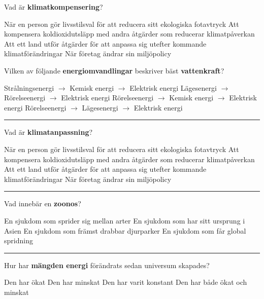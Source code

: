 \documentclass{exam}
\begin{document}
\begin{questions}
\question Vad är \textbf{klimatkompensering}?
\begin{checkboxes}
   \choice När en person gör livsstilsval för att reducera sitt ekologiska fotavtryck
   \choice Att kompensera koldioxidutsläpp med andra åtgärder som reducerar klimatpåverkan
   \choice Att ett land utför åtgärder för att anpassa sig utefter kommande klimatförändringar
   \choice När företag ändrar sin miljöpolicy
\end{checkboxes}

\break
\question Vilken av följande \textbf{energiomvandlingar} beskriver bäst \textbf{vattenkraft}?
\begin{checkboxes}
   \choice Strålningsenergi $\to$ Kemisk energi $\to$ Elektrisk energi
   \choice Lägesenergi $\to$ Rörelseenergi $\to$ Elektrisk energi
   \choice Rörelseenergi $\to$ Kemisk energi $\to$ Elektrisk energi
   \choice Rörelseenergi $\to$ Lägesenergi $\to$ Elektrisk energi
\end{checkboxes}

\vspace{5mm} 
\hrule 
\vspace{5mm} 

\question Vad är \textbf{klimatanpassning}?
\begin{checkboxes}
   \choice När en person gör livsstilsval för att reducera sitt ekologiska fotavtryck
   \choice Att kompensera koldioxidutsläpp med andra åtgärder som reducerar klimatpåverkan
   \choice Att ett land utför åtgärder för att anpassa sig utefter kommande klimatförändringar
   \choice När företag ändrar sin miljöpolicy
\end{checkboxes}

\vspace{5mm} 
\hrule 
\vspace{5mm} 

\question Vad innebär en \textbf{zoonos}?
\begin{checkboxes}
   \choice En sjukdom som sprider sig mellan arter
   \choice En sjukdom som har sitt ursprung i Asien
   \choice En sjukdom som främst drabbar djurparker
   \choice En sjukdom som får global spridning
\end{checkboxes}

\vspace{5mm} 
\hrule 
\vspace{5mm} 

\question Hur har \textbf{mängden energi} förändrats sedan universum skapades?
\begin{checkboxes}
   \choice Den har ökat
   \choice Den har minskat
   \choice Den har varit konstant
   \choice Den har både ökat och minskat
\end{checkboxes}


\end{questions}
\end{document}
